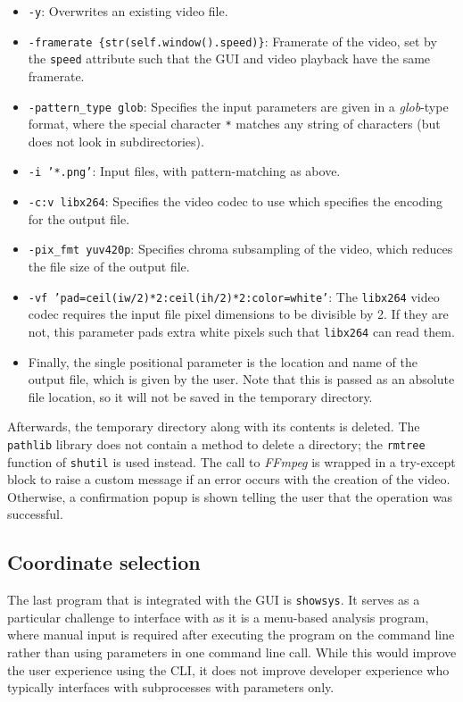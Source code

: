 \documentclass[12pt]{article}
\begin{document}
\begin{itemize}
    \item \texttt{-y}: Overwrites an existing video file.
    \item \texttt{-framerate \{str(self.window().speed)\}}: Framerate of the video, set by the \texttt{speed} attribute such that the GUI and video playback have the same framerate.
    \item \texttt{-pattern\_type glob}: Specifies the input parameters are given in a \textit{glob}-type format, where the special character \texttt{*} matches any string of characters (but does not look in subdirectories).
    \item \texttt{-i '*.png'}: Input files, with pattern-matching as above.
    \item \texttt{-c:v libx264}: Specifies the video codec to use which specifies the encoding for the output file.
    \item \texttt{-pix\_fmt yuv420p}: Specifies chroma subsampling of the video, which reduces the file size of the output file.
    \item \texttt{-vf 'pad=ceil(iw/2)*2:ceil(ih/2)*2:color=white'}: The \texttt{libx264} video codec requires the input file pixel dimensions to be divisible by 2. If they are not, this parameter pads extra white pixels such that \texttt{libx264} can read them.
    \item Finally, the single positional parameter is the location and name of the output file, which is given by the user. Note that this is passed as an absolute file location, so it will not be saved in the temporary directory.
\end{itemize}

\noindent Afterwards, the temporary directory along with its contents is deleted. The \texttt{pathlib} library does not contain a method to delete a directory; the \texttt{rmtree} function of \texttt{shutil} is used instead. The call to \textit{FFmpeg} is wrapped in a try-except block to raise a custom message if an error occurs with the creation of the video. Otherwise, a confirmation popup is shown telling the user that the operation was successful.

\subsection{Coordinate selection}\label{ssec:coordinate_selection}

The last program that is integrated with the GUI is \texttt{showsys}. It serves as a particular challenge to interface with as it is a menu-based analysis program, where manual input is required after executing the program on the command line rather than using parameters in one command line call. While this would improve the user experience using the CLI, it does not improve developer experience who typically interfaces with subprocesses with parameters only.
\end{document}
